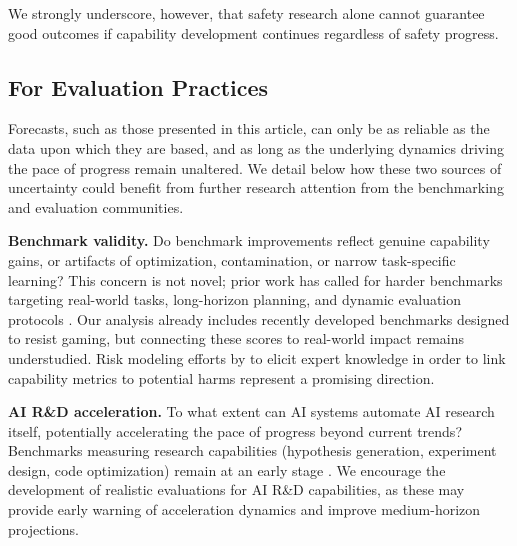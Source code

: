 \documentclass[letterpaper,twocolumn]{article}
\begin{document}
We strongly underscore, however, that safety research alone cannot guarantee good outcomes if capability development continues regardless of safety progress.

\subsection{For Evaluation Practices}
\label{subsec:evaluation}

Forecasts, such as those presented in this article, can only be as reliable as the data upon which they are based, and as long as the underlying dynamics driving the pace of progress remain unaltered. We detail below how these two sources of uncertainty could benefit from further research attention from the benchmarking and evaluation communities.

\textbf{Benchmark validity.} Do benchmark improvements reflect genuine capability gains, or artifacts of optimization, contamination, or narrow task-specific learning? This concern is not novel; prior work has called for harder benchmarks targeting real-world tasks, long-horizon planning, and dynamic evaluation protocols \citep{mazeika_remote_2025, white_livebench_2025}. Our analysis already includes recently developed benchmarks designed to resist gaming, but connecting these scores to real-world impact remains understudied. Risk modeling efforts by \citet{touzet_role_2025, barrett_toward_2025,murray_methodology_2025} to elicit expert knowledge in order to link capability metrics to potential harms represent a promising direction.

\textbf{AI R\&D acceleration.} To what extent can AI systems automate AI research itself, potentially accelerating the pace of progress beyond current trends? Benchmarks measuring research capabilities (hypothesis generation, experiment design, code optimization) remain at an early stage \citep{kwa_measuring_2025,ihle_weirdml_2025}. We encourage the development of realistic evaluations for AI R\&D capabilities, as these may provide early warning of acceleration dynamics and improve medium-horizon projections.


\end{document}
